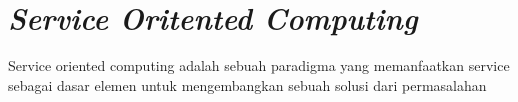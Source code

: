 \section{\textit{Service Oritented Computing}}

Service oriented computing adalah sebuah paradigma yang memanfaatkan service sebagai dasar elemen untuk mengembangkan sebuah solusi dari permasalahan \parencite{papazoglou} 
